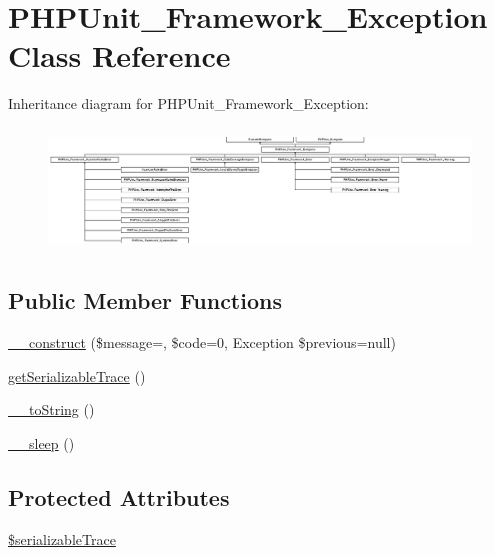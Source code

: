 \hypertarget{class_p_h_p_unit___framework___exception}{}\section{P\+H\+P\+Unit\+\_\+\+Framework\+\_\+\+Exception Class Reference}
\label{class_p_h_p_unit___framework___exception}
Inheritance diagram for P\+H\+P\+Unit\+\_\+\+Framework\+\_\+\+Exception\+:\begin{figure}[H]
\begin{center}
\leavevmode
\includegraphics[height=3.290598cm]{class_p_h_p_unit___framework___exception}
\end{center}
\end{figure}
\subsection*{Public Member Functions}
\begin{DoxyCompactItemize}
\item 
\mbox{\hyperlink{class_p_h_p_unit___framework___exception_a7e221b41646f3a7dfa4df1dbd5f022e7}{\+\_\+\+\_\+construct}} (\$message=\textquotesingle{}\textquotesingle{}, \$code=0, Exception \$previous=null)
\item 
\mbox{\hyperlink{class_p_h_p_unit___framework___exception_abadc7a6a9083a01ea3a709fb2c532817}{get\+Serializable\+Trace}} ()
\item 
\mbox{\hyperlink{class_p_h_p_unit___framework___exception_a7516ca30af0db3cdbf9a7739b48ce91d}{\+\_\+\+\_\+to\+String}} ()
\item 
\mbox{\hyperlink{class_p_h_p_unit___framework___exception_aaf11785905da71774e052912d784e3b4}{\+\_\+\+\_\+sleep}} ()
\end{DoxyCompactItemize}
\subsection*{Protected Attributes}
\begin{DoxyCompactItemize}
\item 
\mbox{\hyperlink{class_p_h_p_unit___framework___exception_aab5ef81bacd671ebd635517248f15484}{\$serializable\+Trace}}
\end{DoxyCompactItemize}


